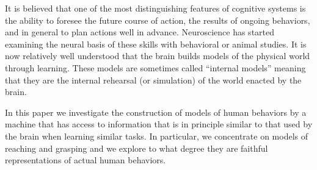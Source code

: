 It is believed that one of the most distinguishing features of cognitive
systems is the ability to foresee the future course of action, the results
of ongoing behaviors, and in general to plan actions well in advance.
Neuroscience has started examining the neural basis of these skills with 
behavioral or animal studies. It is now relatively well understood that
the brain builds models of the physical world through learning. These
models are sometimes called ``internal models'' meaning that they are
the internal rehearsal (or simulation) of the world enacted by the brain.

In this paper we investigate the construction of models of human behaviors
by a machine that has access to information that is in principle similar
to that used by the brain when learning similar tasks. In particular, we
concentrate on models of reaching and grasping and we explore to what degree
they are faithful representations of actual human behaviors.
